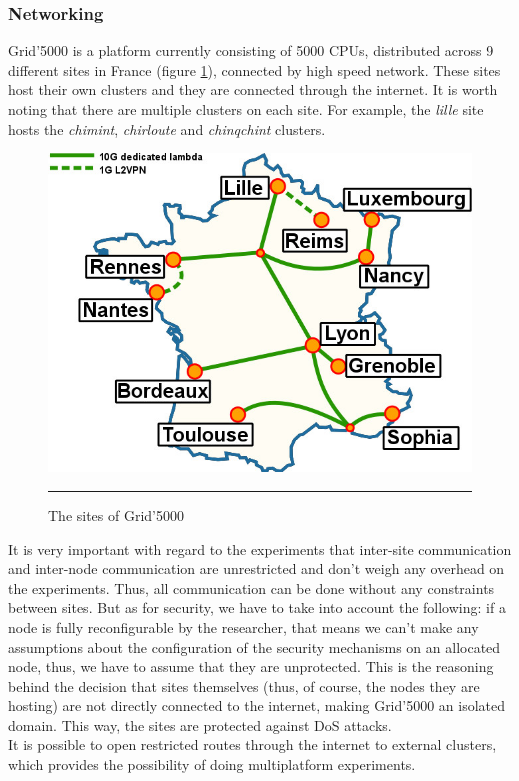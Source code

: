 \subsubsection{Networking}
Grid'5000 is a platform currently consisting of 5000 CPUs, distributed
across 9 different sites in France (figure \ref{fig:g5ksites}),
connected by high speed network. These sites host their own clusters
and they are connected through the internet. It is worth noting that
there are multiple clusters on each site. For example, the
\emph{lille} site hosts the \emph{chimint}, \emph{chirloute} and
\emph{chinqchint} clusters.
\begin{figure}[htbp]
  \centering
    \includegraphics[scale=2]{./Figures/Renater5-g5k.jpg}
    \rule{35em}{0.5pt}
  \caption[Grid'5000 sites]{The sites of Grid'5000}
  \label{fig:g5ksites}
\end{figure}
It is very important with regard to the
experiments that inter-site communication and inter-node communication
are unrestricted and don't weigh any overhead on the
experiments. Thus, all communication can be done without any
constraints between sites. But
as for security, we have to take into account the following: if a
node is fully reconfigurable by the researcher, that means we
can't make any assumptions about the configuration of the security
mechanisms on an allocated node, thus, we have to assume that they are
unprotected. This is the reasoning behind the decision that sites
themselves (thus, of course, the nodes they are hosting) are not
directly connected to the internet, making Grid'5000 an isolated
domain. This way, the sites are protected against DoS attacks.\\
It is possible to open restricted routes through the internet to
external clusters, which provides the possibility of doing
multiplatform experiments.
